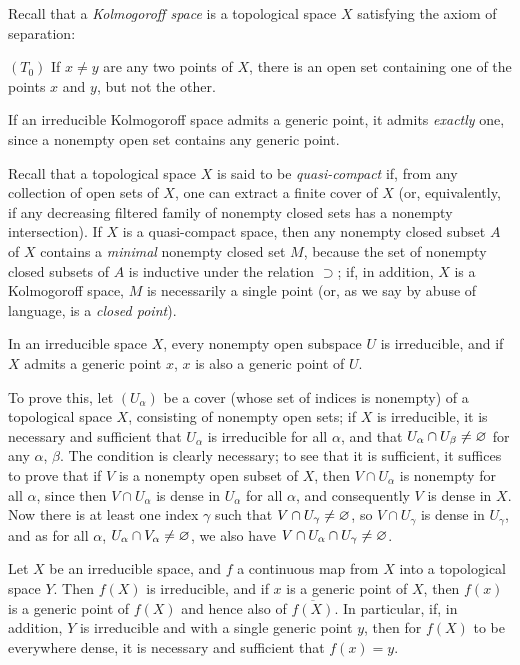 \begin{env}[2.1.3]
\label{0.2.1.3}
Recall that a \emph{Kolmogoroff space} is a topological space $X$ satisfying the axiom of separation:

$(T_0)$ If $x\neq y$ are any two points of $X$, there is an open set containing one of the points $x$ and $y$, but not the other.

If an irreducible Kolmogoroff space admits a generic point, it admits \emph{exactly} one, since a nonempty open set contains any generic point.

Recall that a topological space $X$ is said to be \emph{quasi-compact} if, from any collection of open sets of $X$, one can extract a finite cover of $X$ (or, equivalently, if any decreasing filtered family of nonempty closed sets has a nonempty intersection).
If $X$ is a quasi-compact space, then any nonempty closed subset $A$ of $X$ contains a \emph{minimal} nonempty closed set $M$, because the set of nonempty closed subsets of $A$ is inductive under the relation $\supset$; if, in addition, $X$ is a Kolmogoroff space, $M$ is necessarily a single point (or, as we say by abuse of language, is a \emph{closed point}).
\end{env}

\begin{env}[2.1.4]
\label{0.2.1.4}
In an irreducible space $X$, every nonempty open subspace $U$ is irreducible, and if $X$ admits a generic point $x$, $x$ is also a generic point of $U$.

To prove this, let $(U_\alpha)$ be a cover (whose set of indices is nonempty) of a topological space $X$, consisting of nonempty open sets; if $X$ is irreducible, it is necessary and sufficient that $U_\alpha$ is irreducible for all $\alpha$, and that $U_\alpha\cap U_\beta\neq\varnothing$ for any $\alpha$, $\beta$.
The condition is clearly necessary; to see that it is sufficient, it suffices to prove that if $V$ is a nonempty open subset of $X$, then $V\cap U_\alpha$ is nonempty for all $\alpha$, since then $V\cap U_\alpha$ is dense in $U_\alpha$ for all $\alpha$, and consequently $V$ is dense in $X$.
Now there is at least one index $\gamma$ such that $V\cap U_\gamma\neq\varnothing$, so $V\cap U_\gamma$ is dense in $U_\gamma$, and as for all $\alpha$, $U_\alpha\cap V_\alpha\neq\varnothing$, we also have $V\cap U_\alpha\cap U_\gamma\neq\varnothing$.
\end{env}

\begin{env}[2.1.5]
\label{0.2.1.5}
Let $X$ be an irreducible space, and $f$ a continuous map from $X$ into a topological space $Y$.
Then $f(X)$ is irreducible, and if $x$ is a generic point of $X$, then $f(x)$ is a generic point of $f(X)$ and hence also of $\overline{f(X)}$. 
In particular, if, in addition, $Y$ is irreducible and with a single generic point $y$, then for $f(X)$ to be everywhere dense, it is necessary and sufficient that $f(x)=y$.
\end{env}

